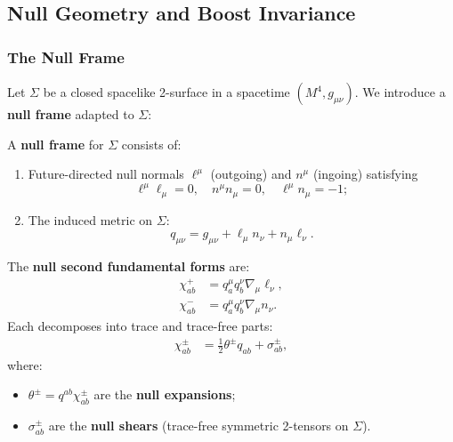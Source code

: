 \subsection{Null Geometry and Boost Invariance}
\label{subsec:null-geometry}

\subsubsection{The Null Frame}

Let $\Sigma$ be a closed spacelike 2-surface in a spacetime $(M^4, g_{\mu\nu})$. We introduce a \textbf{null frame} adapted to $\Sigma$:

\begin{definition}
\label{def:null-frame}
A \textbf{null frame} for $\Sigma$ consists of:
\begin{enumerate}[label=(\roman*)]
\item Future-directed null normals $\ell^\mu$ (outgoing) and $n^\mu$ (ingoing) satisfying
\begin{equation}
\ell^\mu \ell_\mu = 0, \quad n^\mu n_\mu = 0, \quad \ell^\mu n_\mu = -1;
\end{equation}
\item The induced metric on $\Sigma$:
\begin{equation}
q_{\mu\nu} = g_{\mu\nu} + \ell_\mu n_\nu + n_\mu \ell_\nu.
\end{equation}
\end{enumerate}
\end{definition}

\begin{definition}
\label{def:null-sff}
The \textbf{null second fundamental forms} are:
\begin{align}
\chi^+_{ab} &= q_a^\mu q_b^\nu \nabla_\mu \ell_\nu, \label{eq:chi-plus} \\
\chi^-_{ab} &= q_a^\mu q_b^\nu \nabla_\mu n_\nu. \label{eq:chi-minus}
\end{align}
Each decomposes into trace and trace-free parts:
\begin{align}
\chi^\pm_{ab} &= \frac{1}{2}\theta^\pm q_{ab} + \sigma^\pm_{ab},
\end{align}
where:
\begin{itemize}
\item $\theta^\pm = q^{ab}\chi^\pm_{ab}$ are the \textbf{null expansions};
\item $\sigma^\pm_{ab}$ are the \textbf{null shears} (trace-free symmetric 2-tensors on $\Sigma$).
\end{itemize}
\end{definition}

